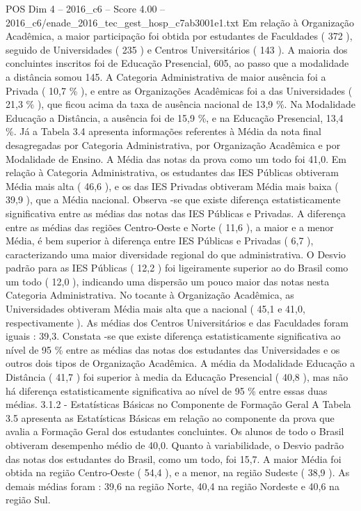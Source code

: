 \begin{textsample}{POS Dim 4 – 2016\_c6 – Score 4.00 – 2016\_c6/enade\_2016\_tec\_gest\_hosp\_c7ab3001e1.txt}
Em relação à Organização Acadêmica, a maior participação foi obtida por estudantes de Faculdades ( 372 ), seguido de Universidades ( 235 ) e Centros Universitários ( 143 ).
A maioria dos concluintes inscritos foi de Educação Presencial, 605, ao passo que a modalidade a distância somou 145.
A Categoria Administrativa de maior ausência foi a Privada ( 10,7 \% ), e entre as Organizações Acadêmicas foi a das Universidades ( 21,3 \% ), que ficou acima da taxa de ausência nacional de 13,9 \%.
Na Modalidade Educação a Distância, a ausência foi de 15,9 \%, e na Educação Presencial, 13,4 \%.
Já a Tabela 3.4 apresenta informações referentes à Média da nota final desagregadas por Categoria Administrativa, por Organização Acadêmica e por Modalidade de Ensino.
A Média das notas da prova como um todo foi 41,0.
Em relação à Categoria Administrativa, os estudantes das IES Públicas obtiveram Média mais alta ( 46,6 ), e os das IES Privadas obtiveram Média mais baixa ( 39,9 ), que a Média nacional.
Observa -se que existe diferença estatisticamente significativa entre as médias das notas das IES Públicas e Privadas.
A diferença entre as médias das regiões Centro-Oeste e Norte ( 11,6 ), a maior e a menor Média, é bem superior à diferença entre IES Públicas e Privadas ( 6,7 ), caracterizando uma maior diversidade regional do que administrativa.
O Desvio padrão para as IES Públicas ( 12,2 ) foi ligeiramente superior ao do Brasil como um todo ( 12,0 ), indicando uma dispersão um pouco maior das notas nesta Categoria Administrativa.
No tocante à Organização Acadêmica, as Universidades obtiveram Média mais alta que a nacional ( 45,1 e 41,0, respectivamente ).
As médias dos Centros Universitários e das Faculdades foram iguais : 39,3.
Constata -se que existe diferença estatisticamente significativa ao nível de 95 \% entre as médias das notas dos estudantes das Universidades e os outros dois tipos de Organização Acadêmica.
A média da Modalidade Educação a Distância ( 41,7 ) foi superior à media da Educação Presencial ( 40,8 ), mas não há diferença estatisticamente significativa ao nível de 95 \% entre essas duas médias. 3.1.2 - Estatísticas Básicas no Componente de Formação Geral A Tabela 3.5 apresenta as Estatísticas Básicas em relação ao componente da prova que avalia a Formação Geral dos estudantes concluintes.
Os alunos de todo o Brasil obtiveram desempenho médio de 40,0.
Quanto à variabilidade, o Desvio padrão das notas dos estudantes do Brasil, como um todo, foi 15,7.
A maior Média foi obtida na região Centro-Oeste ( 54,4 ), e a menor, na região Sudeste ( 38,9 ).
As demais médias foram : 39,6 na região Norte, 40,4 na região Nordeste e 40,6 na região Sul.

\end{textsample}
